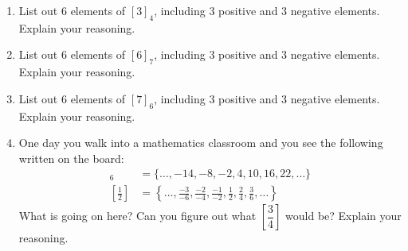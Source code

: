 \begin{problems}
\begin{enumerate}
\item List out $6$ elements of $[3]_4$, including 3 positive and 3
  negative elements. Explain your reasoning.
\item List out $6$ elements of $[6]_7$, including 3 positive and 3
  negative elements. Explain your reasoning.
\item List out $6$ elements of $[7]_6$, including 3 positive and 3
  negative elements. Explain your reasoning.

\item One day you walk into a mathematics classroom and you see the
  following written on the board:
\begin{align*}
[4]_6 &=\{\dots, -14,-8,-2,4,10,16,22,\dots\}\\
\left[\frac{1}{2}\right] &=\left\{\dots, \frac{-3}{-6}, \frac{-2}{-4},
\frac{-1}{-2}, \frac{1}{2}, \frac{2}{4},\frac{3}{6},\dots\right\} 
\end{align*}
What is going on here? Can you figure out what $\left[\dfrac{3}{4}\right]$ would
be? Explain your reasoning.


\end{enumerate}
\end{problems}
